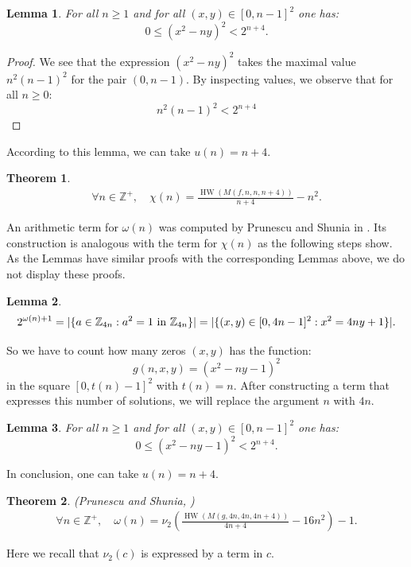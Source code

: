 \documentclass[10pt]{article}
\theoremstyle{plain}
\newtheorem{lemma}{Lemma}[section]
\newtheorem{theorem}{Theorem}[section]
\newcommand{\HW}{\operatorname{HW}}
\newcommand{\Z}{\mathbb{Z}}
\begin{document}
\begin{lemma}
    For all $n \geq 1$ and for all $(x,y) \in [0, n-1]^2$
    one has:
    $$0 \leq (x^2 - ny)^2 < 2^{n+4}.$$
\end{lemma}

\begin{proof}
    We see that the expression $(x^2 - ny)^2$ takes the maximal value $n^2(n-1)^2$ for the pair $(0,n-1)$. By inspecting values, we observe that for all $n \geq 0$:
    $$n^2(n-1)^2 < 2^{n+4}$$
\end{proof}
According to this lemma, we can take $u(n) = n+4$.

\begin{theorem} \label{proof:chi}
\begin{align*}
\forall n \in \Z^+, \quad \chi(n) = \frac{\HW(M(f, n,  n, n+4))}{n+4} - n^2 .
\end{align*}
\end{theorem}

An arithmetic term for $\omega(n)$  was computed by Prunescu and Shunia in \cite{prunescushunia2024primes}. Its construction is analogous with the term for $\chi(n)$ as the following steps show. As the Lemmas have similar proofs with the corresponding Lemmas above, we do not display these proofs.

\begin{lemma}
    $$2^{\omega(n) + 1} = |\{ a \in \mathbb Z_{4n} : a^2 = 1 \textup{  in } \mathbb Z_{4n} \} |  = |\{ (x,y) \in [0, 4n-1]^2 : x^2 = 4ny + 1\} |.$$
\end{lemma}

So we have to count how many zeros $(x,y)$ has the function:
$$g(n, x, y) = (x^2 - ny - 1)^2$$
in the square $[0, t(n)-1]^2$ with $t(n) = n$. After constructing a term that expresses this number of solutions, we will replace the argument $n$ with $4n$.

\begin{lemma}
    For all $n \geq 1$ and for all $(x,y) \in [0, n-1]^2$
    one has:
    $$0 \leq (x^2 - ny - 1)^2 < 2^{n+4}.$$
\end{lemma}
In conclusion, one can take $u(n) = n+4$.

\begin{theorem} (Prunescu and Shunia, \citep[Theorem 5.1]{prunescushunia2024primes}) \label{proof:omegasolutions}
\begin{align*}
\forall n \in \Z^+, \quad
\omega(n) = \nu_2\left( \frac{\HW(M(g, 4n,  4 n, 4 n + 4))}{4 n + 4} - 16 n^2 \right) - 1 .
\end{align*}
\end{theorem}
Here we recall that $\nu_2(c)$ is expressed by a term in $c$.
\end{document}
